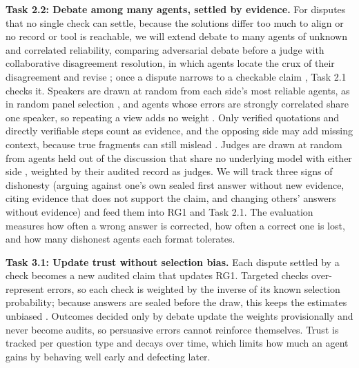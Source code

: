 \documentclass[11pt,letterpaper]{article}
\newcommand{\rg}[1]{\par\vspace{1pt}{\normalfont\bfseries\itshape #1}\par}
\newcommand{\task}[1]{\textbf{#1}\hspace{0.4em}}
\begin{document}
\task{Task 2.2: Debate among many agents, settled by evidence.} For disputes that no single check can settle, because the solutions differ too much to align or no record or tool is reachable, we will extend debate to many agents of unknown and correlated reliability, comparing adversarial debate before a judge \cite{irving2018debate,khan2024debating} with collaborative disagreement resolution, in which agents locate the crux of their disagreement and revise \cite{jiang2026disagreement}; once a dispute narrows to a checkable claim \cite{irving2018debate}, Task 2.1 checks it. Speakers are drawn at random from each side's most reliable agents, as in random panel selection \cite{flanigan2021fair}, and agents whose errors are strongly correlated share one speaker, so repeating a view adds no weight \cite{estornell2024debate}. Only verified quotations and directly verifiable steps count as evidence, and the opposing side may add missing context, because true fragments can still mislead \cite{hu2026lying}. Judges are drawn at random from agents held out of the discussion that share no underlying model with either side \cite{goel2025great}, weighted by their audited record as judges. We will track three signs of dishonesty (arguing against one's own sealed first answer without new evidence, citing evidence that does not support the claim, and changing others' answers without evidence) and feed them into RG1 and Task 2.1. The evaluation measures how often a wrong answer is corrected, how often a correct one is lost, and how many dishonest agents each format tolerates.

\rg{RG3. Learn from verified outcomes}
\task{Task 3.1: Update trust without selection bias.} Each dispute settled by a check becomes a new audited claim that updates RG1. Targeted checks over-represent errors, so each check is weighted by the inverse of its known selection probability; because answers are sealed before the draw, this keeps the estimates unbiased \cite{zrnic2024active}. Outcomes decided only by debate update the weights provisionally and never become audits, so persuasive errors cannot reinforce themselves. Trust is tracked per question type and decays over time, which limits how much an agent gains by behaving well early and defecting later.
\end{document}
